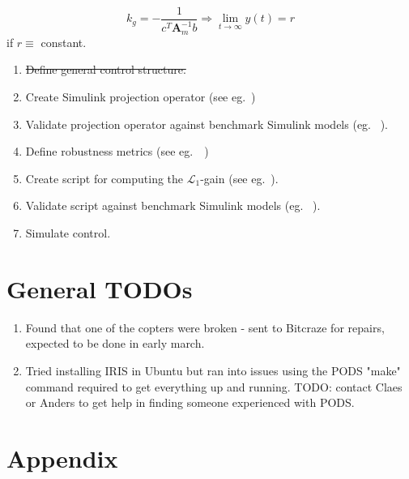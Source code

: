 \documentclass{article}
\begin{document}
\begin{equation}
k_g =-\frac{1}{c^T\mathbf{A}_m^{-1}b} \Rightarrow \lim_{t\rightarrow\infty}y(t) = r
\end{equation}
if $r \equiv$ constant.
\begin{enumerate}
\subsubsection*{TODO}
\item \sout{Define general control structure.}
\item Create Simulink projection operator (see eg.~\cite{L1control})
\item Validate projection operator against benchmark Simulink models (eg. ~\cite{cao2006design}).
\item Define robustness metrics (see eg.~\cite{L1control}~\cite{huynh20141})
\item Create script for computing the $\mathcal{L}_1$-gain (see eg.~\cite{L1control}).
\item Validate script against benchmark Simulink models (eg. ~\cite{cao2006design}).
\item Simulate control.
\end{enumerate}

\section{General TODOs}
\begin{enumerate}
\item Found that one of the copters were broken - sent to Bitcraze for repairs, expected to be done in early march.
\item Tried installing IRIS in Ubuntu but ran into issues using the PODS "make" command required to get everything up and running. TODO: contact Claes or Anders to get help in finding someone experienced with PODS.
\end{enumerate}

\newpage{}


\section{Appendix}\label{sec:appendix}
\end{document}
